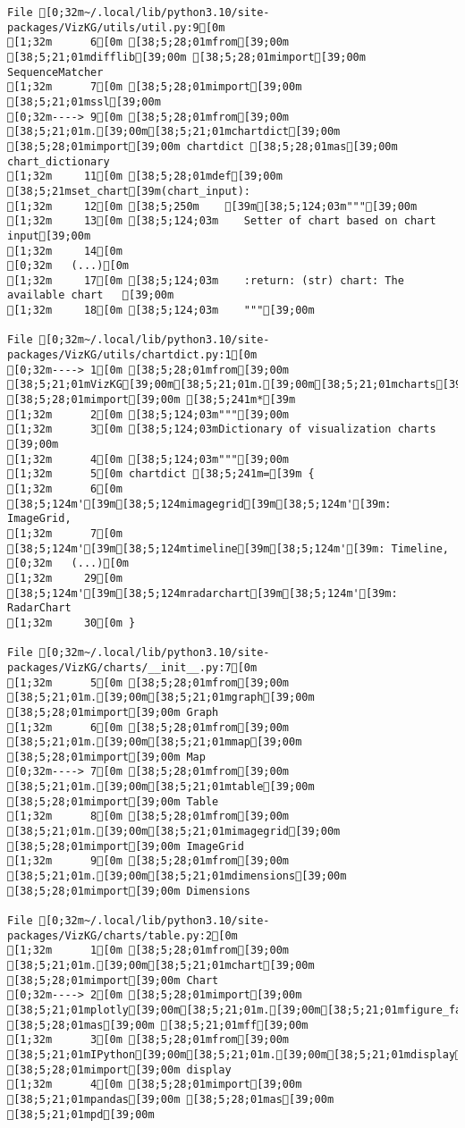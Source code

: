 \documentclass[
  a4paper,
  portrait]{book}
\begin{document}
\begin{verbatim}
File [0;32m~/.local/lib/python3.10/site-packages/VizKG/utils/util.py:9[0m
[1;32m      6[0m [38;5;28;01mfrom[39;00m [38;5;21;01mdifflib[39;00m [38;5;28;01mimport[39;00m SequenceMatcher
[1;32m      7[0m [38;5;28;01mimport[39;00m [38;5;21;01mssl[39;00m
[0;32m----> 9[0m [38;5;28;01mfrom[39;00m [38;5;21;01m.[39;00m[38;5;21;01mchartdict[39;00m [38;5;28;01mimport[39;00m chartdict [38;5;28;01mas[39;00m chart_dictionary
[1;32m     11[0m [38;5;28;01mdef[39;00m [38;5;21mset_chart[39m(chart_input):
[1;32m     12[0m [38;5;250m    [39m[38;5;124;03m"""[39;00m
[1;32m     13[0m [38;5;124;03m    Setter of chart based on chart input[39;00m
[1;32m     14[0m 
[0;32m   (...)[0m
[1;32m     17[0m [38;5;124;03m    :return: (str) chart: The available chart   [39;00m
[1;32m     18[0m [38;5;124;03m    """[39;00m

File [0;32m~/.local/lib/python3.10/site-packages/VizKG/utils/chartdict.py:1[0m
[0;32m----> 1[0m [38;5;28;01mfrom[39;00m [38;5;21;01mVizKG[39;00m[38;5;21;01m.[39;00m[38;5;21;01mcharts[39;00m [38;5;28;01mimport[39;00m [38;5;241m*[39m
[1;32m      2[0m [38;5;124;03m"""[39;00m
[1;32m      3[0m [38;5;124;03mDictionary of visualization charts [39;00m
[1;32m      4[0m [38;5;124;03m"""[39;00m
[1;32m      5[0m chartdict [38;5;241m=[39m {
[1;32m      6[0m     [38;5;124m'[39m[38;5;124mimagegrid[39m[38;5;124m'[39m: ImageGrid,
[1;32m      7[0m     [38;5;124m'[39m[38;5;124mtimeline[39m[38;5;124m'[39m: Timeline,
[0;32m   (...)[0m
[1;32m     29[0m     [38;5;124m'[39m[38;5;124mradarchart[39m[38;5;124m'[39m: RadarChart
[1;32m     30[0m }

File [0;32m~/.local/lib/python3.10/site-packages/VizKG/charts/__init__.py:7[0m
[1;32m      5[0m [38;5;28;01mfrom[39;00m [38;5;21;01m.[39;00m[38;5;21;01mgraph[39;00m [38;5;28;01mimport[39;00m Graph
[1;32m      6[0m [38;5;28;01mfrom[39;00m [38;5;21;01m.[39;00m[38;5;21;01mmap[39;00m [38;5;28;01mimport[39;00m Map
[0;32m----> 7[0m [38;5;28;01mfrom[39;00m [38;5;21;01m.[39;00m[38;5;21;01mtable[39;00m [38;5;28;01mimport[39;00m Table
[1;32m      8[0m [38;5;28;01mfrom[39;00m [38;5;21;01m.[39;00m[38;5;21;01mimagegrid[39;00m [38;5;28;01mimport[39;00m ImageGrid
[1;32m      9[0m [38;5;28;01mfrom[39;00m [38;5;21;01m.[39;00m[38;5;21;01mdimensions[39;00m [38;5;28;01mimport[39;00m Dimensions

File [0;32m~/.local/lib/python3.10/site-packages/VizKG/charts/table.py:2[0m
[1;32m      1[0m [38;5;28;01mfrom[39;00m [38;5;21;01m.[39;00m[38;5;21;01mchart[39;00m [38;5;28;01mimport[39;00m Chart
[0;32m----> 2[0m [38;5;28;01mimport[39;00m [38;5;21;01mplotly[39;00m[38;5;21;01m.[39;00m[38;5;21;01mfigure_factory[39;00m [38;5;28;01mas[39;00m [38;5;21;01mff[39;00m
[1;32m      3[0m [38;5;28;01mfrom[39;00m [38;5;21;01mIPython[39;00m[38;5;21;01m.[39;00m[38;5;21;01mdisplay[39;00m [38;5;28;01mimport[39;00m display
[1;32m      4[0m [38;5;28;01mimport[39;00m [38;5;21;01mpandas[39;00m [38;5;28;01mas[39;00m [38;5;21;01mpd[39;00m


\end{verbatim}
\end{document}

